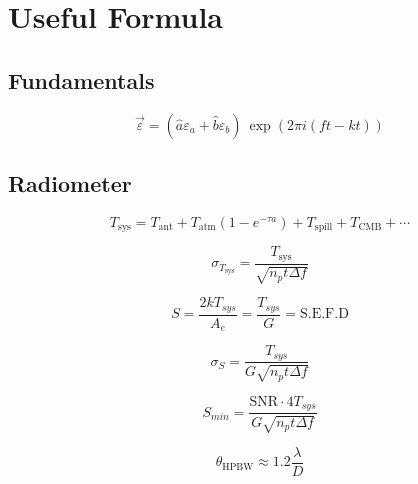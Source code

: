 \chapter{Useful Formula}

\section{Fundamentals}
    \begin{equation}
        \Vec{\varepsilon} = (\hat a \varepsilon_a + \hat b \varepsilon_b) \ \exp(2 \pi i (ft-kt))
    \end{equation}

    \section{Radiometer}

    \begin{equation}
        T_{\text{sys}} = T_{\text{ant}} + T_{\text{atm}}(1 -e^{-\tau a}) + T_{\text{spill}} + T_\text{CMB} + \cdots
    \end{equation}  

    \begin{equation}
        \sigma_{T_{\text{sys}}} = \frac{T_\text{sys}}{\sqrt{n_p t \Delta f}}
    \end{equation}

    \begin{equation}
        S = \frac{2kT_{sys}}{A_e} = \frac{T_{sys}}{G} = \text{S.E.F.D}
    \end{equation}

    \begin{equation}
        \sigma_S = \frac{T_{sys}}{G\sqrt{n_p t \Delta f}}
    \end{equation}

     \begin{equation}
        S_{min} = \frac{ \text{SNR} \cdot 4T_{sys}}{G\sqrt{n_p t \Delta f}}
    \end{equation}

    


    \begin{equation}
        \theta_\text{HPBW} \approx 1.2 \frac{\lambda}{D}
    \end{equation}



